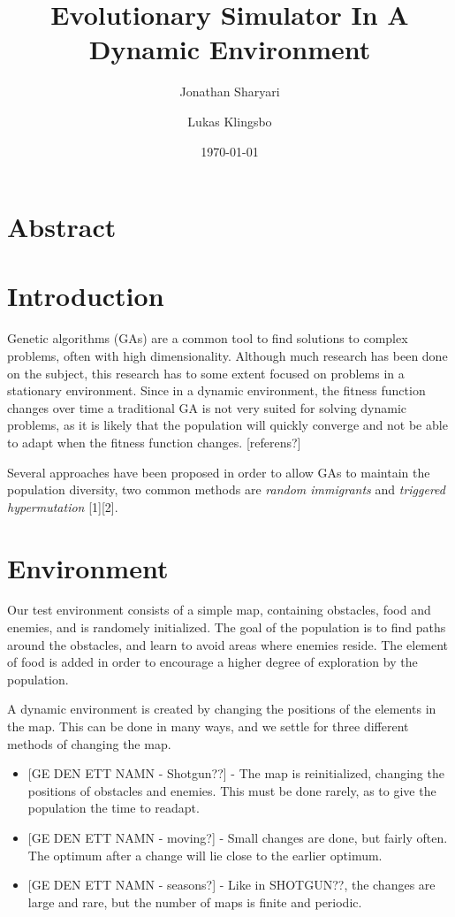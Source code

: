 \documentclass[a4paper,12pt]{article}
\title{\textbf{Evolutionary Simulator In A Dynamic Environment}}
\author{Jonathan Sharyari \and Lukas Klingsbo}  %
\date{\today}
\begin{document}
\maketitle


\section{Abstract}

\section{Introduction}
Genetic algorithms (GAs) are a common tool to find solutions to complex problems, often with high dimensionality. Although much research has been done on the subject, this research has to some extent focused on problems in a stationary environment. Since in a dynamic environment, the fitness function changes over time a traditional GA is not very suited for solving dynamic problems, as it is likely that the population will quickly converge and not be able to adapt when the fitness function changes. [referens?]

Several approaches have been proposed in order to allow GAs to maintain the population diversity, two common methods are \emph{random immigrants} and \emph{triggered hypermutation} [1][2].

\section{Environment}
Our test environment consists of a simple map, containing obstacles, food and enemies, and is randomely initialized. The goal of the population is to find paths around the obstacles, and learn to avoid areas where enemies reside. The element of food is added in order to encourage a higher degree of exploration by the population.

A dynamic environment is created by changing the positions of the elements in the map. This can be done in many ways, and we settle for three different methods of changing the map.

\begin{itemize}
\item

[GE DEN ETT NAMN - Shotgun??] - The map is reinitialized, changing the positions of obstacles and enemies. This must be done rarely, as to give the population the time to readapt.
\item

[GE DEN ETT NAMN - moving?] - Small changes are done, but fairly often. The optimum after a change will lie close to the earlier optimum.
\item

[GE DEN ETT NAMN - seasons?] - Like in SHOTGUN??, the changes are large and rare, but the number of maps is finite and periodic.
\end{itemize}
\end{document}

